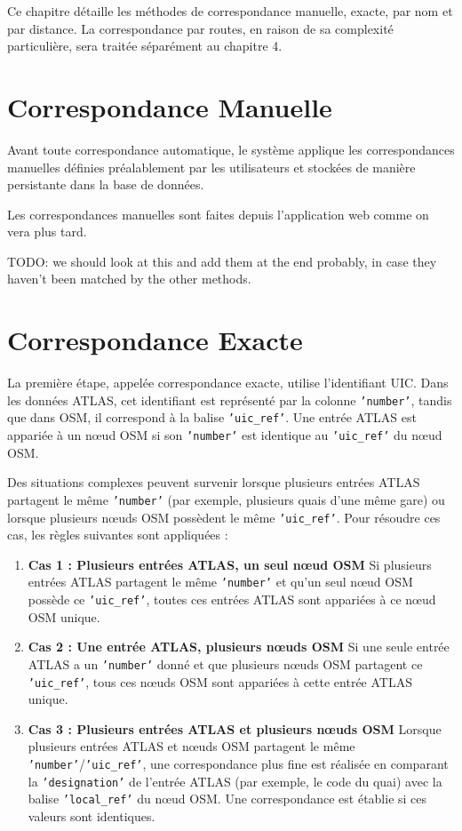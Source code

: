 Ce chapitre détaille les méthodes de correspondance manuelle, exacte, par nom et par distance. La correspondance par routes, en raison de sa complexité particulière, sera traitée séparément au chapitre 4.

\section{Correspondance Manuelle}

Avant toute correspondance automatique, le système applique les correspondances manuelles définies préalablement par les utilisateurs et stockées de manière persistante dans la base de données. 

Les correspondances manuelles sont faites depuis l'application web comme on vera plus tard.

TODO: we should look at this and add them at the end probably, in case they haven't been matched by the other methods.

\section{Correspondance Exacte}

La première étape, appelée correspondance exacte, utilise l’identifiant UIC. Dans les données ATLAS, cet identifiant est représenté par la colonne \texttt{'number'}, tandis que dans OSM, il correspond à la balise \texttt{'uic\_ref'}. Une entrée ATLAS est appariée à un nœud OSM si son \texttt{'number'} est identique au \texttt{'uic\_ref'} du nœud OSM.

Des situations complexes peuvent survenir lorsque plusieurs entrées ATLAS partagent le même \texttt{'number'} (par exemple, plusieurs quais d’une même gare) ou lorsque plusieurs nœuds OSM possèdent le même \texttt{'uic\_ref'}. Pour résoudre ces cas, les règles suivantes sont appliquées :

\begin{enumerate}
    \item \textbf{Cas 1 : Plusieurs entrées ATLAS, un seul nœud OSM}  
    Si plusieurs entrées ATLAS partagent le même \texttt{'number'} et qu’un seul nœud OSM possède ce \texttt{'uic\_ref'}, toutes ces entrées ATLAS sont appariées à ce nœud OSM unique.

    \item \textbf{Cas 2 : Une entrée ATLAS, plusieurs nœuds OSM}  
    Si une seule entrée ATLAS a un \texttt{'number'} donné et que plusieurs nœuds OSM partagent ce \texttt{'uic\_ref'}, tous ces nœuds OSM sont appariées à cette entrée ATLAS unique.

    \item \textbf{Cas 3 : Plusieurs entrées ATLAS et plusieurs nœuds OSM}  
    Lorsque plusieurs entrées ATLAS et nœuds OSM partagent le même \texttt{'number'}/\texttt{'uic\_ref'}, une correspondance plus fine est réalisée en comparant la \texttt{'designation'} de l’entrée ATLAS (par exemple, le code du quai) avec la balise \texttt{'local\_ref'} du nœud OSM. Une correspondance est établie si ces valeurs sont identiques.
\end{enumerate}

